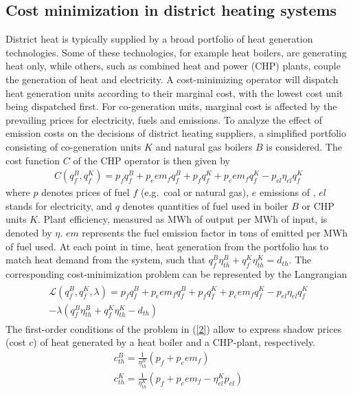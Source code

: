 \documentclass[preprint, 12pt, authoryear]{elsarticle}
\begin{document}
\subsection{Cost minimization in district heating systems}
District heat is typically supplied by a broad portfolio of heat generation technologies.
Some of these technologies, for example heat boilers, are generating heat only, while others, such as combined heat and power (CHP) plants, couple the generation of heat and electricity.
A cost-minimizing operator will dispatch heat generation units according to their marginal cost, with the lowest cost unit being dispatched first.
For co-generation units, marginal cost is affected by the prevailing prices for electricity, fuels and  emissions.
To analyze the effect of emission costs on the decisions of district heating suppliers, a simplified portfolio consisting of co-generation units $K$ and natural gas boilers $B$ is considered.
The cost function $C$ of the CHP operator is then given by
\begin{align}\label{1}
C(q_{f}^{B}, q_{f}^{K}) = p_{f} q_{f}^{B} + p_{e} em_{f} q_{f}^{B} + p_{f} q_{f}^{K} + p_{e} em_{f} q_{f}^{K} - p_{el} \eta_{el} q_{f}^{K}
\end{align}
where $p$ denotes prices of fuel $f$ (e.g.~coal or natural gas), $e$ emissions of , $el$ stands for electricity, and $q$ denotes quantities of fuel used in boiler $B$ or CHP units $K$.
Plant efficiency, measured as MWh of output per MWh of input, is denoted by $\eta$. $em$ represents the fuel emission factor in tons of  emitted per MWh of fuel used.
At each point in time, heat generation from the portfolio has to match heat demand from the system, such that $q_{f}^{B} \eta_{th}^{B} + q_{f}^{K} \eta_{th}^{K} = d_{th}$.
The corresponding cost-minimization problem can be represented by the Langrangian
\begin{align}\label{2}
\begin{split}
\mathcal{L}(q_{f}^{B},q_{f}^{K},\lambda)= p_{f} q_{f}^{B} + p_{e} em_{f} q_{f}^{B} + p_{f} q_{f}^{K} + p_{e} em_{f} q_{f}^{K} - p_{el} \eta_{el} q_{f}^{K} \\ - \lambda ( q_{f}^{B} \eta_{th}^{B} + q_{f}^{K} \eta_{th}^{K} - d_{th})
\end{split}
\end{align}
The first-order conditions of the problem in (\ref{2}) allow to express shadow prices (cost $c$) of heat generated by a heat boiler and a CHP-plant, respectively.
\begin{align}\label{3_4}
c_{th}^{B} = \frac{1}{\eta_{th}^{B}} (p_{f} + p_{e} em_{f}) \\
c_{th}^{K} = \frac{1}{\eta_{th}^{K}} (p_{f} + p_{e} em_{f} - \eta_{el}^{K} p_{el})
\end{align}
\end{document}
